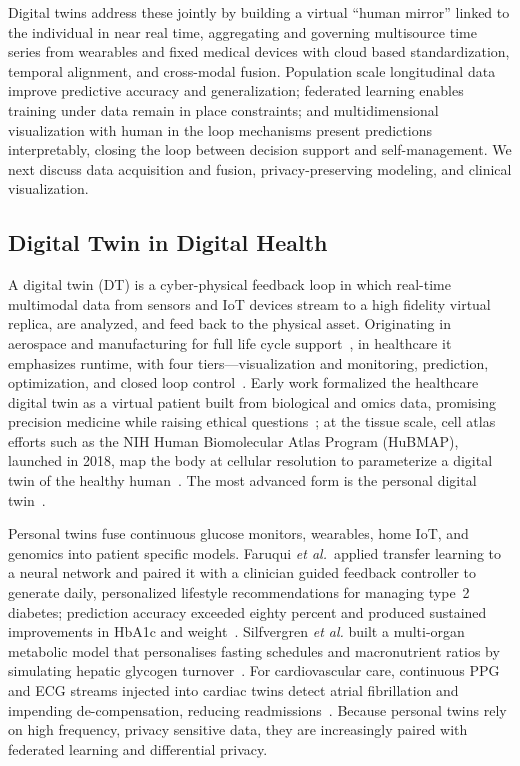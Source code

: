 \documentclass[journal]{IEEEtran}
\begin{document}
Digital twins address these jointly by building a virtual ``human mirror'' linked to the individual in near real time, aggregating and governing multisource time series from wearables and fixed medical devices with cloud based standardization, temporal alignment, and cross-modal fusion. Population scale longitudinal data improve predictive accuracy and generalization; federated learning enables training under data remain in place constraints; and multidimensional visualization with human in the loop mechanisms present predictions interpretably, closing the loop between decision support and self-management. We next discuss data acquisition and fusion, privacy-preserving modeling, and clinical visualization.

\subsection{Digital Twin in Digital Health}

A digital twin (DT) is a cyber-physical feedback loop in which real-time multimodal data from sensors and IoT devices stream to a high fidelity virtual replica, are analyzed, and feed back to the physical asset. Originating in aerospace and manufacturing for full life cycle support~\cite{Tao2018}, in healthcare it emphasizes runtime, with four tiers---visualization and monitoring, prediction, optimization, and closed loop control~\cite{NIST2021,sun2023digitaltwin}. Early work formalized the healthcare digital twin as a virtual patient built from biological and omics data, promising precision medicine while raising ethical questions~\cite{Bruynseels2018DigitalTwins}; at the tissue scale, cell atlas efforts such as the NIH Human Biomolecular Atlas Program (HuBMAP), launched in 2018, map the body at cellular resolution to parameterize a digital twin of the healthy human~\cite{HuBMAP2019}. The most advanced form is the personal digital twin~\cite{deKerckhove2021}.

Personal twins fuse continuous glucose monitors, wearables, home IoT, and genomics into patient specific models. Faruqui \emph{et al.}\ applied transfer learning to a neural network and paired it with a clinician guided feedback controller to generate daily, personalized lifestyle recommendations for managing type 2 diabetes; prediction accuracy exceeded eighty percent and produced sustained improvements in HbA1c and weight~\cite{Faruqui2024}. Silfvergren \emph{et al.} built a multi-organ metabolic model that personalises fasting schedules and macronutrient ratios by simulating hepatic glycogen turnover \cite{Silfvergren2022}. For cardiovascular care, continuous PPG and ECG streams injected into cardiac twins detect atrial fibrillation and impending de-compensation, reducing readmissions \cite{Bayoumy2021,Williams2023}. Because personal twins rely on high frequency, privacy sensitive data, they are increasingly paired with federated learning and differential privacy.
\end{document}
